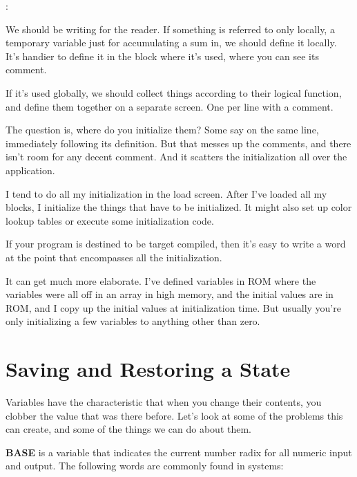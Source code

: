 \begin{interview}
:

\begin{tfquot}
We should be writing for the reader. If something is referred to only locally,
a temporary variable just for accumulating a sum in, we should define it
locally. It's handier to define it in the block where it's used, where you can
see its comment.

If it's used globally, we should collect things according to their logical
function, and define them together on a separate screen. One per line with a
comment.

The question is, where do you initialize them? Some say on the same line,
immediately following its definition. But that messes up the comments,
and there isn't room for any decent comment. And it scatters the
initialization all over the application.

I tend to do all my initialization in the load screen. After I've loaded all my
blocks, I initialize the things that have to be initialized. It might also set
up color lookup tables or execute some initialization code.

If your program is destined to be target compiled, then it's easy to write a
word at the point that encompasses all the initialization.

It can get much more elaborate. I've defined variables in ROM where the
variables were all off in an array in high memory, and the initial values are
in ROM, and I copy up the initial values at initialization time. But usually
you're only initializing a few variables to anything other than zero.
\end{tfquot}
\end{interview}

\section{Saving and Restoring a State}

Variables have the characteristic that when you change their contents,
you clobber the value that was there before. Let's look at some of the
problems this can create, and some of the things we can do about them.

\textbf{BASE} is a variable that indicates the current
number radix for all numeric input and output. The following words are
commonly found in \Forth{} systems:

